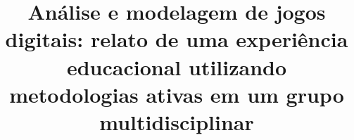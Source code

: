 \documentclass[12pt, onecolumn]{IEEEtran}
\begin{document}
\title{Análise e modelagem de jogos digitais: relato de uma experiência educacional utilizando metodologias ativas em um grupo multidisciplinar}

\newcommand{\pucsp}{Pontifícia Universidade Católica de São Paulo (PUC-SP)}
\newcommand{\dolemes}{David de Oliveira Lemes}
\newcommand{\ezequiel}{Ezequiel França dos Santos}
\newcommand{\adriano}{Adriano Felix Valente}
\newcommand{\celso}{Celso Fujimoto}
\newcommand{\eduardo}{Eduardo Romanek}

\newcommand{\curso}{Mestrado Profissional em Desenvolvimento de Jogos Digitais}
\newcommand{\universidade}{Pontifícia Universidade Católica de São Paulo}
\newcommand{\anonimo}{}
\newcommand{\emailanonimo}{.}


\makeatletter
\newcommand{\linebreakand}{%
  \end{@IEEEauthorhalign}
  \hfill\mbox{}\par
  \mbox{}\hfill\begin{@IEEEauthorhalign}
}
\makeatother

\end{document}
